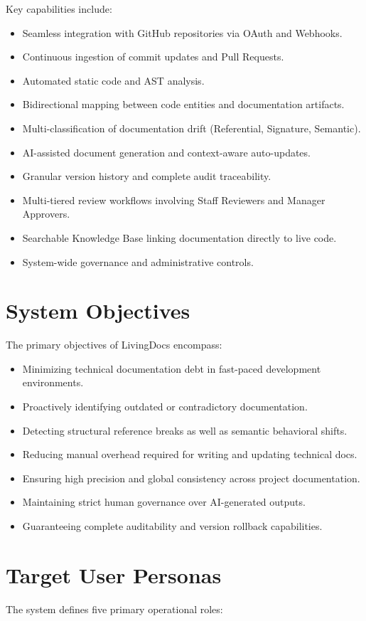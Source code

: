 Key capabilities include:
\begin{itemize}
	\item Seamless integration with GitHub repositories via OAuth and Webhooks.
	\item Continuous ingestion of commit updates and Pull Requests.
	\item Automated static code and AST analysis.
	\item Bidirectional mapping between code entities and documentation artifacts.
	\item Multi-classification of documentation drift (Referential, Signature, Semantic).
	\item AI-assisted document generation and context-aware auto-updates.
	\item Granular version history and complete audit traceability.
	\item Multi-tiered review workflows involving Staff Reviewers and Manager Approvers.
	\item Searchable Knowledge Base linking documentation directly to live code.
	\item System-wide governance and administrative controls.
\end{itemize}

\section{System Objectives}
The primary objectives of LivingDocs encompass:
\begin{itemize}
	\item Minimizing technical documentation debt in fast-paced development environments.
	\item Proactively identifying outdated or contradictory documentation.
	\item Detecting structural reference breaks as well as semantic behavioral shifts.
	\item Reducing manual overhead required for writing and updating technical docs.
	\item Ensuring high precision and global consistency across project documentation.
	\item Maintaining strict human governance over AI-generated outputs.
	\item Guaranteeing complete auditability and version rollback capabilities.
\end{itemize}

\section{Target User Personas}
The system defines five primary operational roles:

